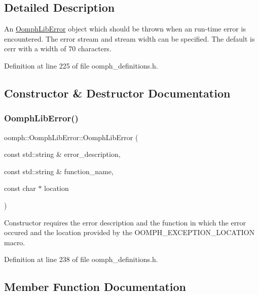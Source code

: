 \subsection{Detailed Description}
An \hyperlink{classoomph_1_1OomphLibError}{Oomph\+Lib\+Error} object which should be thrown when an run-\/time error is encountered. The error stream and stream width can be specified. The default is cerr with a width of 70 characters. 

Definition at line 225 of file oomph\+\_\+definitions.\+h.



\subsection{Constructor \& Destructor Documentation}
\mbox{\label{classoomph_1_1OomphLibError_a2706846fffe8d60e13918daec455e780}} 
\subsubsection{\texorpdfstring{Oomph\+Lib\+Error()}{OomphLibError()}}
{\footnotesize\ttfamily oomph\+::\+Oomph\+Lib\+Error\+::\+Oomph\+Lib\+Error (\begin{DoxyParamCaption}\item[{const std\+::string \&}]{error\+\_\+description,  }\item[{const std\+::string \&}]{function\+\_\+name,  }\item[{const char $\ast$}]{location }\end{DoxyParamCaption})\hspace{0.3cm}{\ttfamily [inline]}}



Constructor requires the error description and the function in which the error occured and the location provided by the O\+O\+M\+P\+H\+\_\+\+E\+X\+C\+E\+P\+T\+I\+O\+N\+\_\+\+L\+O\+C\+A\+T\+I\+ON macro. 



Definition at line 238 of file oomph\+\_\+definitions.\+h.



\subsection{Member Function Documentation}
\mbox{\label{classoomph_1_1OomphLibError_a9c1f4842949a5938f2646428cb390124}} 
